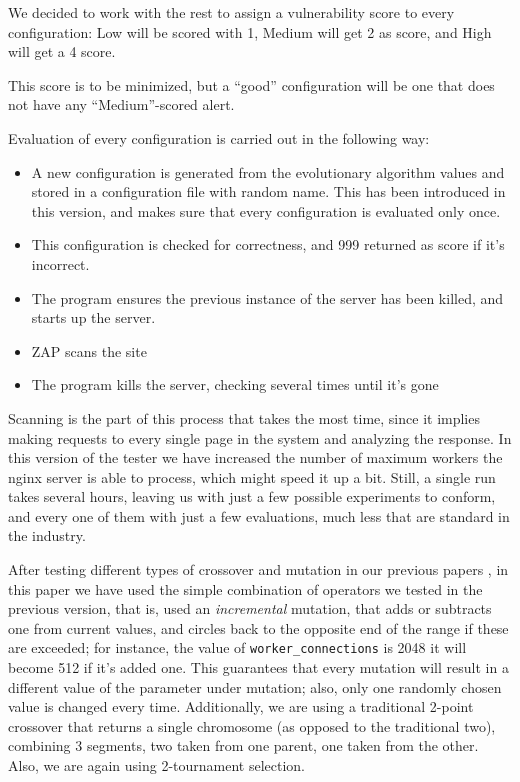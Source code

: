 \documentclass[sigconf]{acmart}
\begin{document}
We decided to work with the rest to assign a vulnerability score to
every configuration: Low will be scored with 1, Medium will get 2 as
score, and High will get a 4 score.

This score is to be minimized, but a ``good'' configuration will be
one that does not have any ``Medium''-scored alert.

Evaluation of every configuration is carried out in the following way:\begin{itemize}

\item A new configuration is generated from the evolutionary algorithm
  values and stored in a configuration file with random name. This has
  been introduced in this version, and makes sure that every
  configuration is evaluated only once.

\item This configuration is checked for correctness, and 999 returned
  as score if it's incorrect.
\item The program ensures the previous instance of the server has been
  killed, and starts up the server.
\item ZAP scans the site
\item The program kills the server, checking several times until it's gone

\end{itemize}

Scanning is the part of this process that takes the most time, since
it implies making requests to every single page in the system and
analyzing the response. In this version of the tester we have
increased the number of maximum workers the {\sf nginx} server is able
to process, which might speed it up a bit. Still, a single run takes
several hours, leaving us with just a few possible experiments to
conform, and every one of them with just a few evaluations, much less
that are standard in the industry.

After testing different types of crossover and mutation in our
previous papers \cite{erseco:evostar:anon,erseco:cec}, in this paper
we have used the simple combination of operators we tested in the
previous version, that is, used an  {\em incremental} mutation, that
adds or subtracts one from
current values, and circles back to the opposite end of the range if
these are exceeded; for instance,  the value of {\tt worker\_connections} is
2048 it will become 512 if it's added one. This guarantees that every
mutation will result in a different value of the parameter under
mutation; also, only one randomly chosen value is changed every
time. Additionally, we are using a traditional 2-point crossover that
returns a single chromosome (as opposed to the traditional two),
combining 3 segments, two taken from one parent, one taken from the
other. Also, we are again using 2-tournament selection.
\end{document}
